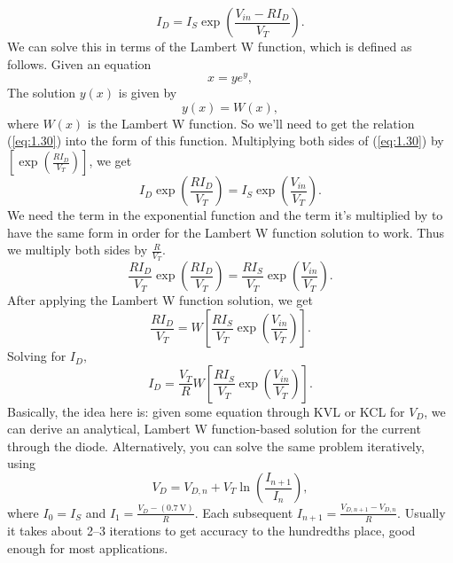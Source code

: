 \begin{equation}
\label{eq:1.30}
I_{D} = I_{S} \exp \left( \frac{V_{in} - R I_{D}}{V_{T}} \right).
\end{equation}
We can solve this in terms of the Lambert W function, which is defined as follows. Given an equation
\begin{equation}
\label{eq:1.31}
x = y e^{y},
\end{equation}
The solution $y(x)$ is given by
\begin{equation}
\label{eq:1.32}
y(x) = W(x),
\end{equation}
where $W(x)$ is the Lambert W function. So we'll need to get the relation (\ref{eq:1.30}) into the form of this function.
Multiplying both sides of (\ref{eq:1.30}) by $\left[ \exp \left( \frac{R I_{D}}{V_{T}} \right) \right]$, we get
\begin{equation}
\label{eq:1.33}
I_{D} \exp \left( \frac{R I_{D}}{V_{T}} \right) = I_{S} \exp \left( \frac{V_{in}}{V_{T}} \right).
\end{equation}
We need the term in the exponential function and the term it's multiplied by to have the same form in order for the Lambert W function solution to work. Thus we multiply both sides by $\frac{R}{V_{T}}$.
\begin{equation}
\label{eq:1.34}
\frac{R I_{D}}{V_{T}} \exp \left( \frac{R I_{D}}{V_{T}} \right) = \frac{R I_{S}}{V_{T}} \exp \left( \frac{V_{in}}{V_{T}} \right).
\end{equation}
After applying the Lambert W function solution, we get
\begin{equation}
\label{eq:1.35}
\frac{R I_{D}}{V_{T}} = W \left[ \frac{R I_{S}}{V_{T}} \exp \left( \frac{V_{in}}{V_{T}} \right) \right].
\end{equation}
Solving for $I_{D},$
\begin{equation}
\label{eq:1.36}
I_{D} = \frac{V_{T}}{R} W \left[ \frac{R I_{S}}{V_{T}} \exp \left( \frac{V_{in}}{V_{T}} \right) \right].
\end{equation}
Basically, the idea here is: given some equation through KVL or KCL for $V_{D}$, we can derive an analytical, Lambert W function-based solution for the current through the diode. Alternatively, you can solve the same problem iteratively, using
\begin{equation}
\label{eq:1.37}
V_{D} = V_{D,n} + V_{T} \ln \left( \frac{I_{n+1}}{I_{n}} \right),
\end{equation}
where $I_{0} = I_{S}$ and $I_{1} = \frac{ V_{D} - \left( \SI{0.7}{\volt} \right) }{R}$. Each subsequent $I_{n+1} = \frac{ V_{D,n+1} - V_{D,n} }{R}$. Usually it takes about 2--3 iterations to get accuracy to the hundredths place, good enough for most applications.
